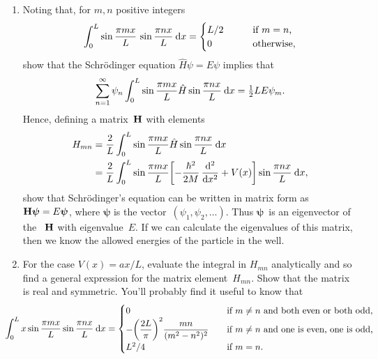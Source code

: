 \documentclass[12pt]{article}
\begin{document}
\begin{exercises}
\begin{enumerate}\setlength{\itemsep}{0pt}
\item Noting that, for $m,n$ positive integers
\begin{displaymath}
\int_0^L \sin {\pi m x\over L} \,\sin{\pi n x\over L} \>\mathrm{d} x
  = \begin{cases}
      L/2 & \qquad\mbox{if $m=n$,} \\
      0          & \qquad\mbox{otherwise,}
    \end{cases}
\end{displaymath}
show that the Schr\"odinger equation $\hat{H}\psi = E\psi$ implies that
\begin{displaymath}
\sum_{n=1}^\infty \psi_n \int_0^L \sin{\pi m x\over L}
                  \hat{H}\sin{\pi n x\over L} \>\mathrm{d} x
  = \tfrac12 L E \psi_m.
\end{displaymath}
Hence, defining a matrix~$\mathbf{H}$ with elements
\begin{align*}
H_{mn} &= {2\over L} \int_0^L \sin{\pi m x\over L}
          \hat{H}\sin{\pi n x\over L} \>\mathrm{d} x \nonumber\\
       &= {2\over L} \int_0^L \sin{\pi m x\over L}
          \biggl[ - {\hbar^2\over2M}\,{\mathrm{d}^2\over\mathrm{d} x^2} + V(x) \biggr]
          \sin{\pi n x\over L} \>\mathrm{d} x,
\end{align*}
show that Schr\"odinger's equation can be written in matrix form as
$\mathbf{H}\boldsymbol{\psi} = E\boldsymbol{\psi}$, where $\boldsymbol{\psi}$
is the vector~$(\psi_1,\psi_2,\ldots)$.  Thus $\boldsymbol{\psi}$~is an
eigenvector of the ~$\mathbf{H}$ with eigenvalue~$E$.
If we can calculate the eigenvalues of this matrix, then we know the
allowed energies of the particle in the well.
\item For the case $V(x)=ax/L$, evaluate the integral in $H_{mn}$
  analytically and so find a general expression for the matrix
  element~$H_{mn}$.  Show that the matrix is real and symmetric.  You'll
  probably find it useful to know that
\begin{displaymath}
\hspace{-2em}
\int_0^L x \sin{\pi m x\over L} \sin{\pi n x\over L} \>\dd x
  = \begin{cases}
      0 & \quad\mbox{if $m\ne n$ and both even or both odd,} \\
      {\displaystyle-\biggl({2L\over\pi}\biggr)^2{mn\over(m^2-n^2)^2}}
        & \quad\mbox{if $m\ne n$ and one is even, one is odd,} \\
      L^2/4 & \quad\mbox{if $m=n$.}

\end{cases}
\end{displaymath}
\end{enumerate}
\end{exercises}
\end{document}
